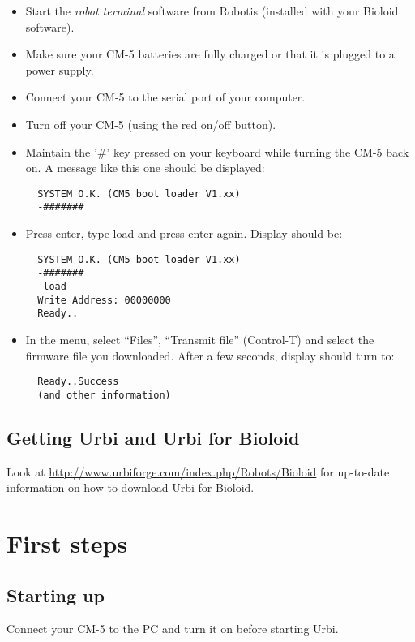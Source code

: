 \begin{itemize}
\item Start the \emph{robot terminal} software from Robotis (installed with
  your Bioloid software).
\item Make sure your CM-5 batteries are fully charged or that it is plugged
  to a power supply.
\item Connect your CM-5 to the serial port of your computer.
\item Turn off your CM-5 (using the red on/off button).
\item Maintain the '\#' key pressed on your keyboard while turning the CM-5
  back on. A message like this one should be displayed:

\begin{verbatim}
  SYSTEM O.K. (CM5 boot loader V1.xx)
  -#######
\end{verbatim}

\item Press enter, type load and press enter again. Display should be:
\begin{verbatim}
  SYSTEM O.K. (CM5 boot loader V1.xx)
  -#######
  -load
  Write Address: 00000000
  Ready..
\end{verbatim}

\item In the menu, select ``Files'', ``Transmit file'' (Control-T) and
  select the firmware file you downloaded. After a few seconds, display
  should turn to:
\begin{verbatim}
  Ready..Success
  (and other information)
\end{verbatim}
\end{itemize}

\subsection{Getting Urbi and Urbi for Bioloid}

Look at \url{http://www.urbiforge.com/index.php/Robots/Bioloid} for
up-to-date information on how to download Urbi for Bioloid.

\section{First steps}

\subsection{Starting up}
Connect your CM-5 to the PC and turn it on before starting Urbi.

